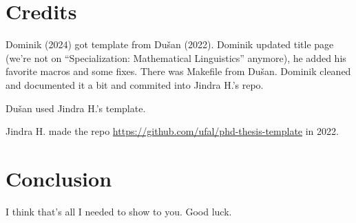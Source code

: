 \chapter{Credits}
\label{chap:credits}

Dominik (2024) got template from Dušan (2022). Dominik updated title page (we're not on
``Specialization: Mathematical Linguistics'' anymore), he added his
favorite macros and some fixes. There was Makefile from Dušan. Dominik cleaned
and documented it a bit and commited into Jindra H.'s repo.

Dušan used Jindra H.'s template. 

Jindra H. made the repo \url{https://github.com/ufal/phd-thesis-template} in 2022.


\chapter{Conclusion}%
\label{chap:conslusion}

I think that's all I needed to show to you. Good luck.
